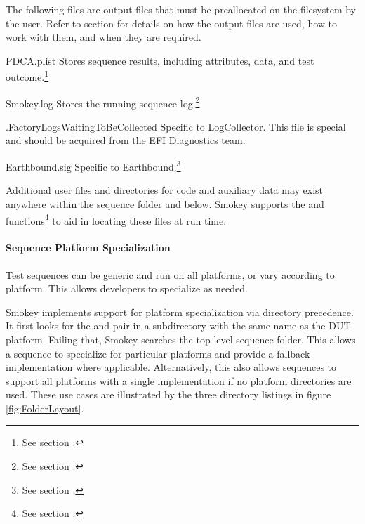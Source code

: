 The following files are output files that must be preallocated on the
filesystem by the user.  Refer to section  for
details on how the output files are used, how to work with them, and when they
are required.

\begin{Definition}

	\item[PDCA.plist] Stores sequence results, including attributes, data,
	and test outcome.\footnote{See section
	.\label{fn:LogCollectorFiles}}

	\item[Smokey.log] Stores the running sequence log.\footnote{See section
	.}

	\item[.FactoryLogsWaitingToBeCollected] Specific to
	LogCollector.  This file is special and
	should be acquired from the EFI Diagnostics team.

	\item[Earthbound.sig] Specific to Earthbound.\footnote{See section
	.}

\end{Definition}

Additional user files and directories for code and auxiliary data may exist
anywhere within the sequence folder and below.  Smokey supports the
 and  functions\footnote{See section
.\label{fn:LocatorFunctions}} to aid in locating
these files at run time.

\paragraph{Sequence Platform Specialization}

Test sequences can be generic and run on all platforms, or vary according to
platform.  This allows developers to specialize as needed.

Smokey implements support for platform specialization via directory precedence.
It first looks for the  and  pair in a
subdirectory with the same name as the DUT platform.  Failing that, Smokey
searches the top-level sequence folder.  This allows a sequence to specialize
for particular platforms and provide a fallback implementation where
applicable.  Alternatively, this also allows sequences to support all platforms
with a single implementation if no platform directories are used.  These use
cases are illustrated by the three directory listings in figure
\ref{fig:FolderLayout}.

